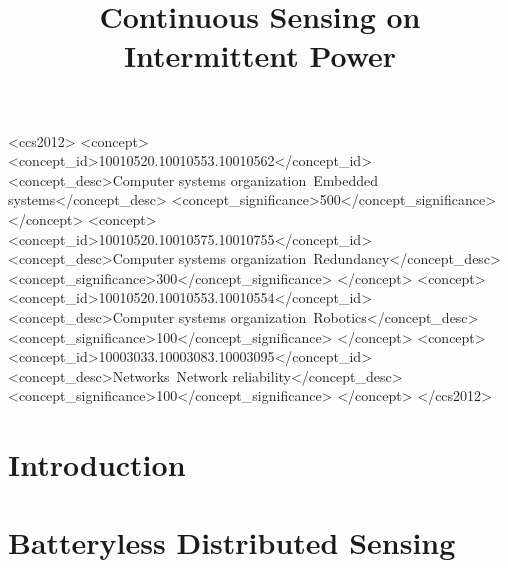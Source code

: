 \documentclass[sigconf]{acmart}
\begin{document}
\title{Continuous Sensing on Intermittent Power} 




\begin{abstract}

\end{abstract}
%
%
\begin{CCSXML}
<ccs2012>
 <concept>
  <concept_id>10010520.10010553.10010562</concept_id>
  <concept_desc>Computer systems organization~Embedded systems</concept_desc>
  <concept_significance>500</concept_significance>
 </concept>
 <concept>
  <concept_id>10010520.10010575.10010755</concept_id>
  <concept_desc>Computer systems organization~Redundancy</concept_desc>
  <concept_significance>300</concept_significance>
 </concept>
 <concept>
  <concept_id>10010520.10010553.10010554</concept_id>
  <concept_desc>Computer systems organization~Robotics</concept_desc>
  <concept_significance>100</concept_significance>
 </concept>
 <concept>
  <concept_id>10003033.10003083.10003095</concept_id>
  <concept_desc>Networks~Network reliability</concept_desc>
  <concept_significance>100</concept_significance>
 </concept>
</ccs2012>
\end{CCSXML}



\maketitle


\section{Introduction}
\label{sec:introduction}


\section{Batteryless Distributed Sensing}
\label{sec:disSensing}


\end{document}
